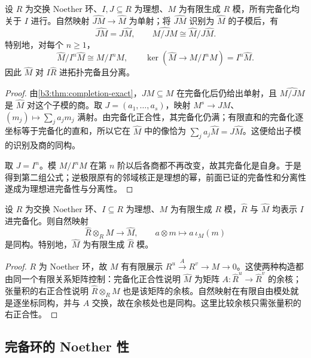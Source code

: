 \begin{proposition}\label{b3:prop:completion-quotients}
	设 \(R\) 为交换 Noether 环、\(I,J\subseteq R\) 为理想、\(M\) 为有限生成 \(R\) 模，所有完备化均关于 \(I\) 进行。自然映射 \(\widehat{JM}\to\widehat M\) 为单射；将 \(\widehat{JM}\) 识别为 \(\widehat M\) 的子模后，有
	\[
		\widehat{JM}=J\widehat M, \qquad \widehat{M/JM}\cong\widehat M/J\widehat M.
	\]
	特别地，对每个 \(n\ge1\)，
	\[
		\widehat M/I^n\widehat M\cong M/I^nM, \qquad \ker(\widehat M\rightarrow M/I^nM)=I^n\widehat M.
	\]
	因此 \(\widehat M\) 对 \(I\widehat R\) 进拓扑完备且分离。
\end{proposition}
\begin{proof}
	由\cref{b3:thm:completion-exact}，\(JM\subseteq M\) 在完备化后仍给出单射，且 \(\widehat{M/JM}\) 是 \(\widehat M\) 对这个子模的商。取 \(J=(a_1,\ldots,a_s)\)，映射 \(M^s\rightarrow JM\)、\((m_j)\mapsto\sum_ja_jm_j\) 满射。由完备化正合性，其完备化仍满；有限直和的完备化逐坐标等于完备化的直和，所以它在 \(\widehat M\) 中的像恰为 \(\sum_ja_j\widehat M=J\widehat M\)。这便给出子模的识别及商的同构。

	取 \(J=I^n\)。模 \(M/I^nM\) 在第 \(n\) 阶以后各商都不再改变，故其完备化是自身。于是得到第二组公式；逆极限原有的邻域核正是理想的幂，前面已证的完备性和分离性遂成为理想进完备性与分离性。
\end{proof}

\begin{theorem}\label{b3:thm:completion-tensor}
	设 \(R\) 为交换 Noether 环、\(I\subseteq R\) 为理想、\(M\) 为有限生成 \(R\) 模，\(\widehat R\) 与 \(\widehat M\) 均表示 \(I\) 进完备化。则自然映射
	\[
		\widehat R\otimes_RM\longrightarrow\widehat M, \qquad a\otimes m\longmapsto a\,\iota_M(m)
	\]
	是同构。特别地，\(\widehat M\) 为有限生成 \(\widehat R\) 模。
\end{theorem}
\begin{proof}
	\(R\) 为 Noether 环，故 \(M\) 有有限展示 \(R^u\xrightarrow{A}R^v\rightarrow M\rightarrow0\)。这使两种构造都由同一个有限关系矩阵控制：完备化正合性说明 \(\widehat M\) 为矩阵 \(A:\widehat R^u\rightarrow\widehat R^v\) 的余核；张量积的右正合性说明 \(\widehat R\otimes_RM\) 也是该矩阵的余核。自然映射在有限自由模处就是逐坐标同构，并与 \(A\) 交换，故在余核处也是同构。这里比较余核只需张量积的右正合性。
\end{proof}

\subsection{完备环的 Noether 性}
\label{b3:subsec:1303:noetherian}


